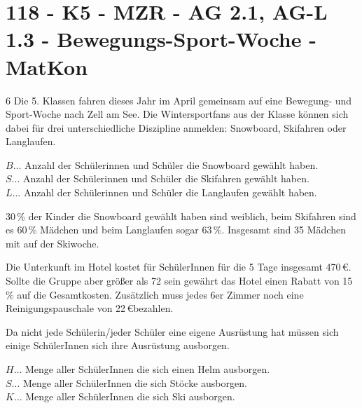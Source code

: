 \section{118 - K5 - MZR - AG 2.1, AG-L 1.3 - Bewegungs-Sport-Woche - MatKon}

\begin{langesbeispiel} \item[6] %
Die 5. Klassen fahren dieses Jahr im April gemeinsam auf eine Bewegung- und Sport-Woche nach Zell am See. Die Wintersportfans aus der Klasse können sich dabei für drei unterschiedliche Diszipline anmelden: Snowboard, Skifahren oder Langlaufen.

$B\ldots$ Anzahl der Schülerinnen und Schüler die Snowboard gewählt haben.\\
$S\ldots$ Anzahl der Schülerinnen und Schüler die Skifahren gewählt haben.\\
$L\ldots$ Anzahl der Schülerinnen und Schüler die Langlaufen gewählt haben.%

\begin{aufgabenstellung}
\item 30\,\% der Kinder die Snowboard gewählt haben sind weiblich, beim Skifahren sind es 60\,\% Mädchen und beim Langlaufen sogar 63\,\%. Insgesamt sind 35 Mädchen mit auf der Skiwoche.%


Die Unterkunft im Hotel kostet für SchülerInnen für die 5 Tage insgesamt 470\,\euro. Sollte die Gruppe aber größer als 72 sein gewährt das Hotel einen Rabatt von 15\,\% auf die Gesamtkosten. Zusätzlich muss jedes 6er Zimmer noch eine Reinigungspauschale von 22\,\euro bezahlen.


\item Da nicht jede Schülerin/jeder Schüler eine eigene Ausrüstung hat müssen sich einige SchülerInnen sich ihre Ausrüstung ausborgen.

$H\ldots$ Menge aller SchülerInnen die sich einen Helm ausborgen.\\
$S\ldots$ Menge aller SchülerInnen die sich Stöcke ausborgen.\\
$K\ldots$ Menge aller SchülerInnen die sich Ski ausborgen.


\end{aufgabenstellung}
\end{langesbeispiel}
